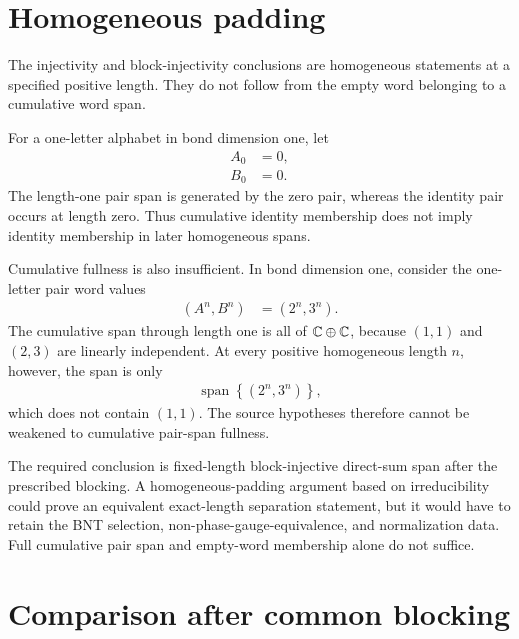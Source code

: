 \documentclass{article}
\begin{document}
\section{Homogeneous padding}

The injectivity and block-injectivity conclusions are homogeneous statements at
a specified positive length. They do not follow from the empty word belonging
to a cumulative word span.

For a one-letter alphabet in bond dimension one, let
\begin{align}
    A_0
        &=
        0,
    \label{eq:rmp_nonperiodic_bnt_comparison_inputs_zero_pair_first_tensor}\\
    B_0
        &=
        0.
    \label{eq:rmp_nonperiodic_bnt_comparison_inputs_zero_pair_second_tensor}
\end{align}
The length-one pair span is generated by the zero pair, whereas the identity
pair occurs at length zero. Thus cumulative identity membership does not imply
identity membership in later homogeneous spans.

Cumulative fullness is also insufficient. In bond dimension one, consider the
one-letter pair word values
\begin{align}
    \left(A^n,B^n\right)
        &=
        \left(2^n,3^n\right).
    \label{eq:rmp_nonperiodic_bnt_comparison_inputs_scalar_pair_words}
\end{align}
The cumulative span through length one is all of $\mathbb{C}\oplus\mathbb{C}$, because
$(1,1)$ and $(2,3)$ are linearly independent. At every positive
homogeneous length $n$, however, the span is only
\begin{align}
    \operatorname{span}
        \left\{\left(2^n,3^n\right)\right\},
    \label{eq:rmp_nonperiodic_bnt_comparison_inputs_scalar_homogeneous_line}
\end{align}
which does not contain $(1,1)$. The source hypotheses therefore cannot be
weakened to cumulative pair-span fullness.

The required conclusion is fixed-length block-injective direct-sum span after
the prescribed blocking. A homogeneous-padding argument based on irreducibility
could prove an equivalent exact-length separation statement, but it would have
to retain the BNT selection, non-phase-gauge-equivalence, and normalization
data. Full cumulative pair span and empty-word membership alone do not suffice.

\section{Comparison after common blocking}
\end{document}
